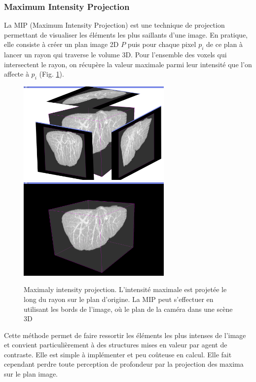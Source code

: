       \subsubsection{Maximum Intensity Projection}
      La MIP (Maximum Intensity Projection) est une technique de projection permettant de visualiser les éléments les plus saillants d'une image. En pratique, elle consiste à créer un plan image 2D $P$ puis pour chaque pixel $p_i$ de ce plan à lancer un rayon qui traverse le volume 3D. Pour l'ensemble des voxels qui intersectent le rayon, on récupère la valeur maximale parmi leur intensité que l'on affecte à $p_i$ (Fig. \ref{fig:MIP_visualisation}). 

      \begin{figure}[h]
        \centering
        \includegraphics[height=5cm]{Images/3D_mip_montage.png}
        \includegraphics[height=5cm]{Images/3D_mip.png}
        \caption{Maximaly intensity projection. L'intensité maximale est projetée le long du rayon sur le plan d'origine. La MIP peut s'effectuer en utilisant les bords de l'image, où le plan de la caméra dans une scène 3D}
        \label{fig:MIP_visualisation}
      \end{figure}

      Cette méthode permet de faire ressortir les éléments les plus intenses de l'image et convient particulièrement à des structures mises en valeur par agent de contraste. Elle est simple à implémenter et peu coûteuse en calcul. Elle fait cependant perdre toute perception de profondeur par la projection des maxima sur le plan image. 
      
